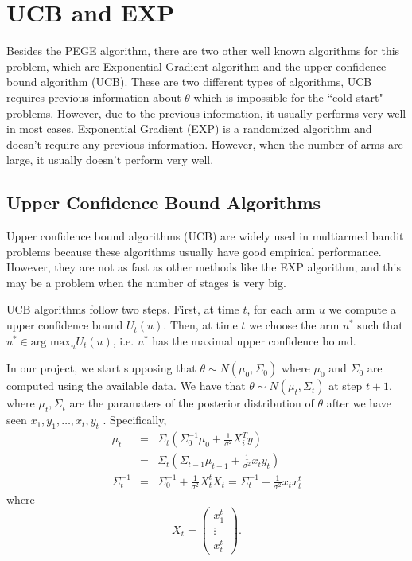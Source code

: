 \documentclass{article}
\theoremstyle{plain}
\theoremstyle{definition}
\begin{document}
\section{UCB and EXP}
Besides the PEGE algorithm, there are two other well known algorithms for this problem, which are Exponential Gradient algorithm and the upper confidence bound algorithm (UCB). These are two different types of algorithms, UCB requires previous information about $\theta$ which is impossible for the ``cold start" problems. However, due to the previous information, it usually performs very well in most cases. Exponential Gradient (EXP) is a randomized algorithm and doesn't require any previous information. However, when the number of arms are large, it usually doesn't perform very well.



\subsection{Upper Confidence Bound Algorithms}

Upper confidence bound algorithms (UCB) are widely used in multiarmed
bandit problems because these algorithms usually have good empirical performance. 
However, they are not as fast as other methods like the EXP algorithm, and this may be a problem
when the number of stages is very big.

UCB algorithms follow two steps. First, at time $t$, for each arm
$u$ we compute a upper confidence bound $U_{t}\left(u\right)$. Then,
at time $t$ we choose the arm $u^{*}$ such that $u^{*}\in\mbox{arg max}_{u}U_{t}\left(u\right)$,
i.e. $u^{*}$ has the maximal upper confidence bound. 

In our project, we start supposing that $\theta\sim N\left(\mu_{0},\Sigma_{0}\right)$
where $\mu_{0}$ and $\Sigma_{0}$ are computed using the available
data. We have that $\theta\sim N\left(\mu_{t},\Sigma_{t}\right)$
at step $t+1$, where $\mu_{t},\Sigma_{t}$ are the paramaters of
the posterior distribution of $\theta$ after we have seen $x_{1},y_{1},\ldots,x_{t},y_{t}$
. Specifically,
\begin{eqnarray*}
\mu_{t} & = & \Sigma_{t}\left(\Sigma_{0}^{-1}\mu_{0}+\frac{1}{\sigma^{2}}X_{i}^{T}y\right)\\
 & = & \Sigma_{t}\left(\Sigma_{t-1}\mu_{t-1}+\frac{1}{\sigma^{2}}x_{t}y_{t}\right)\\
\Sigma_{t}^{-1} & = & \Sigma_{0}^{-1}+\frac{1}{\sigma^{2}}X_{t}^{t}X_{t}=\Sigma_{t}^{-1}+\frac{1}{\sigma^{2}}x_{t}x_{t}^{t}
\end{eqnarray*}
where 
\[
X_{t}=\left(\begin{array}{c}
x_{1}^{t}\\
\vdots\\
x_{t}^{t}
\end{array}\right).
\]
\end{document}
